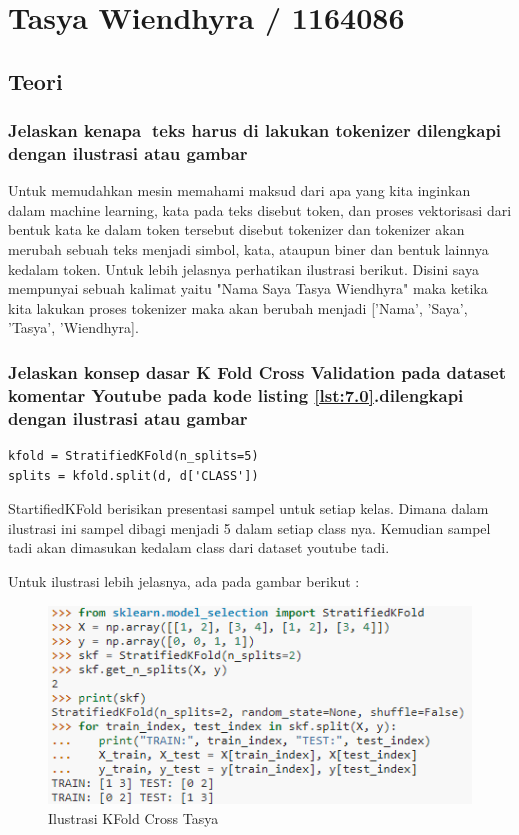 \section{Tasya Wiendhyra / 1164086}
\subsection{Teori}
\subsubsection{Jelaskan kenapa teks harus di lakukan tokenizer dilengkapi dengan ilustrasi atau gambar}
Untuk memudahkan mesin memahami maksud dari apa yang kita inginkan dalam machine learning, kata pada teks disebut token, dan proses vektorisasi dari bentuk kata ke dalam token tersebut disebut tokenizer dan tokenizer akan merubah sebuah teks menjadi simbol, kata, ataupun biner dan bentuk lainnya kedalam token. Untuk lebih jelasnya perhatikan ilustrasi berikut. Disini saya mempunyai sebuah kalimat yaitu "Nama Saya Tasya Wiendhyra" maka ketika kita lakukan proses tokenizer maka akan berubah menjadi ['Nama', 'Saya', 'Tasya', 'Wiendhyra].

\subsubsection{Jelaskan konsep dasar K Fold Cross Validation pada dataset komentar Youtube pada kode listing \ref{lst:7.0}.dilengkapi dengan ilustrasi atau gambar} 
\begin{lstlisting}[caption=K Fold Cross Validation,label={lst:7.0}]
kfold = StratifiedKFold(n_splits=5)
splits = kfold.split(d, d['CLASS'])
\end{lstlisting}

StartifiedKFold berisikan presentasi sampel untuk setiap kelas. Dimana dalam ilustrasi ini sampel dibagi menjadi 5 dalam setiap class nya. Kemudian sampel tadi akan dimasukan kedalam class dari dataset youtube tadi.

Untuk ilustrasi lebih jelasnya, ada pada gambar berikut :
\begin{figure}[ht]
\centering
\includegraphics[scale=0.5]{figures/Chapter 7/1164086/Teori/chapter7tasya1.png}
\caption{Ilustrasi KFold Cross Tasya}
\label{Teori}
\end{figure}

